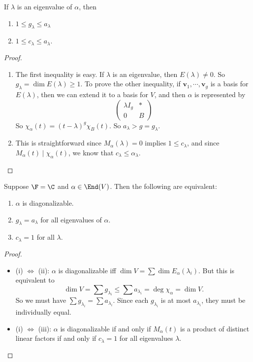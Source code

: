 \documentclass[a4paper]{article}
\begin{document}
\begin{lemma}
  If $\lambda$ is an eigenvalue of $\alpha$, then
  \begin{enumerate}
    \item $1 \leq g_\lambda \leq a_\lambda$
    \item $1 \leq c_\lambda \leq a_\lambda$.
  \end{enumerate}
\end{lemma}
\begin{proof}\leavevmode
  \begin{enumerate}
    \item The first inequality is easy. If $\lambda$ is an eigenvalue, then $E(\lambda) \not= 0$. So $g_\lambda = \dim E(\lambda) \geq 1$. To prove the other inequality, if $\mathbf{v}_1, \cdots, \mathbf{v}_g$ is a basis for $E(\lambda)$, then we can extend it to a basis for $V$, and then $\alpha$ is represented by
      \[
        \begin{pmatrix}
          \lambda I_g & *\\
          0 & B
        \end{pmatrix}
      \]
      So $\chi_\alpha(t) = (t - \lambda)^g \chi_B(t)$. So $a_\lambda > g = g_\lambda$.
    \item This is straightforward since $M_\alpha(\lambda) = 0$ implies $1 \leq c_\lambda$, and since $M_\alpha(t) \mid \chi_\alpha(t)$, we know that $c_\lambda \leq \alpha_\lambda$.
  \end{enumerate}
\end{proof}

\begin{lemma}
  Suppose $\F = \C$ and $\alpha \in \End(V)$. Then the following are equivalent:
  \begin{enumerate}
    \item $\alpha$ is diagonalizable.
    \item $g_\lambda = a_\lambda$ for all eigenvalues of $\alpha$.
    \item $c_\lambda = 1$ for all $\lambda$.
  \end{enumerate}
\end{lemma}

\begin{proof}\leavevmode
  \begin{itemize}
    \item (i) $\Leftrightarrow$ (ii): $\alpha$ is diagonalizable iff $\dim V = \sum \dim E_\alpha (\lambda_i)$. But this is equivalent to
      \[
       \dim V = \sum g_{\lambda_i} \leq \sum a_{\lambda_i} = \deg \chi_\alpha = \dim V.
     \]
     So we must have $\sum g_{\lambda_i} = \sum a_{\lambda_i}$. Since each $g_{\lambda_i}$ is at most $a_{\lambda_i}$, they must be individually equal.

   \item (i) $\Leftrightarrow$ (iii): $\alpha$ is diagonalizable if and only if $M_\alpha(t)$ is a product of distinct linear factors if and only if $c_\lambda = 1$ for all eigenvalues $\lambda$.
  \end{itemize}
\end{proof}
\end{document}
